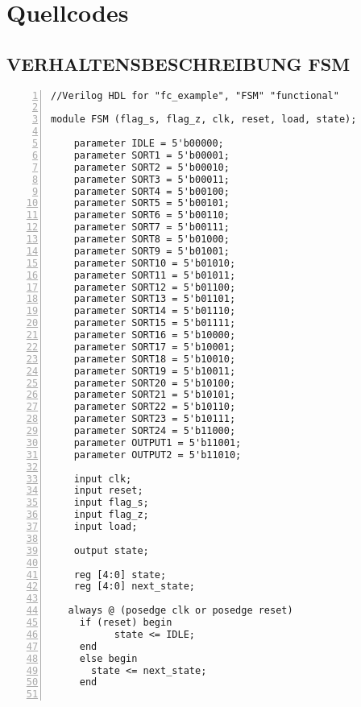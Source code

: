 \chapter{Quellcodes}
\label{sec:conclusion}

\section{VERHALTENSBESCHREIBUNG FSM}

\begin{lstlisting}[numbers=left,xleftmargin=1em, multicols=2,frame=leftline, basicstyle = \small\ttfamily]
//Verilog HDL for "fc_example", "FSM" "functional"

module FSM (flag_s, flag_z, clk, reset, load, state);

	parameter IDLE = 5'b00000;
	parameter SORT1 = 5'b00001;
	parameter SORT2 = 5'b00010;
	parameter SORT3 = 5'b00011;
	parameter SORT4 = 5'b00100;
	parameter SORT5 = 5'b00101;
	parameter SORT6 = 5'b00110;
	parameter SORT7 = 5'b00111;
	parameter SORT8 = 5'b01000;
	parameter SORT9 = 5'b01001;
	parameter SORT10 = 5'b01010;
	parameter SORT11 = 5'b01011;
	parameter SORT12 = 5'b01100;
	parameter SORT13 = 5'b01101;
	parameter SORT14 = 5'b01110;
	parameter SORT15 = 5'b01111;
	parameter SORT16 = 5'b10000;
	parameter SORT17 = 5'b10001;
	parameter SORT18 = 5'b10010;
	parameter SORT19 = 5'b10011;
	parameter SORT20 = 5'b10100;
	parameter SORT21 = 5'b10101;
	parameter SORT22 = 5'b10110;
	parameter SORT23 = 5'b10111;
	parameter SORT24 = 5'b11000;
	parameter OUTPUT1 = 5'b11001;
	parameter OUTPUT2 = 5'b11010;

	input clk;
	input reset;
	input flag_s;
	input flag_z;
	input load;

	output state;

	reg [4:0] state;
	reg [4:0] next_state;

   always @ (posedge clk or posedge reset)
     if (reset) begin
           state <= IDLE;
     end
     else begin
       state <= next_state;
     end


\end{lstlisting}
